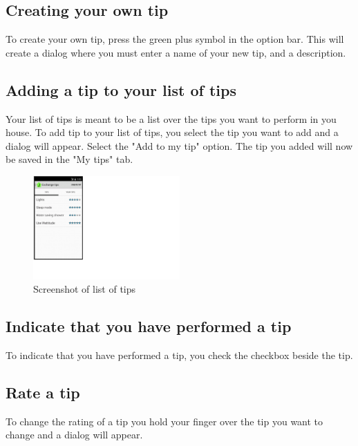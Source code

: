 \subsection{Creating your own tip}
To create your own tip, press the green plus symbol in the option bar. This will create a dialog where you must enter a name of your new tip, and a description. 
\subsection{Adding a tip to your list of tips}
Your list of tips is meant to be a list over the tips you want to perform in you house. To add tip to your list of tips, you select the tip you want to add and a dialog will appear. Select the "Add to my tip" option. The tip you added will now be saved in the "My tips" tab. 

\begin{figure}[H]
\centering
\includegraphics[width=0.5\textwidth, clip, trim=0cm 4cm 19.5cm 0cm]{appendix/usermanual/fig/Tipstab.png}
\caption{Screenshot of list of tips}
\end{figure}

\subsection{Indicate that you have performed a tip}
To indicate that you have performed a tip, you check the checkbox beside the tip.
\subsection{Rate a tip}
To change the rating of a tip you hold your finger over the tip you want to change and a dialog will appear. 

